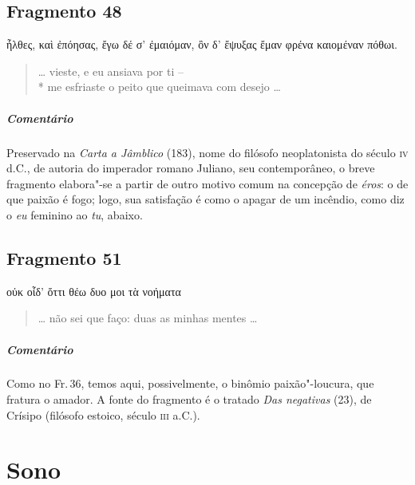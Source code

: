 \section{Fragmento 48}

\begin{gkverse}
ἦλθες, \dagger{}καὶ\dagger{} ἐπόησας, ἔγω δέ σ’ ἐμαιόμαν,
ὂν δ’ ἔψυξας ἔμαν φρένα καιομέναν πόθωι.
\end{gkverse}

\begin{verse}
\ldots{} vieste, e eu ansiava por ti -- \\*
me esfriaste o peito que queimava com desejo \ldots{}
\end{verse}

\medskip

{\paragraph{Comentário} Preservado na \textit{Carta a Jâmblico} (183), nome do filósofo neoplatonista do
século \textsc{iv} d.C., de autoria do imperador romano Juliano, seu contemporâneo, o
breve fragmento elabora"-se a partir de outro motivo comum na concepção de
\textit{éros}: o de que paixão é fogo; logo, sua satisfação é como o apagar de
um incêndio, como diz o \textit{eu} feminino ao \textit{tu}, abaixo.}

\pagebreak
\section{Fragmento 51}

\begin{gkverse}
οὐκ οἶδ’ ὄττι θέω δυο μοι τὰ νοήματα
\end{gkverse}

\begin{verse}
\ldots{} não sei que faço: duas as minhas mentes \ldots{}
\end{verse}

\medskip

{\paragraph{Comentário} Como no Fr.\,36, temos aqui, possivelmente, o binômio paixão"-loucura, que fratura o amador. A
fonte do fragmento é o tratado \textit{Das negativas} (23), de Crísipo (filósofo
estoico, século \textsc{iii} a.C.).}   


\chapter{Sono}

